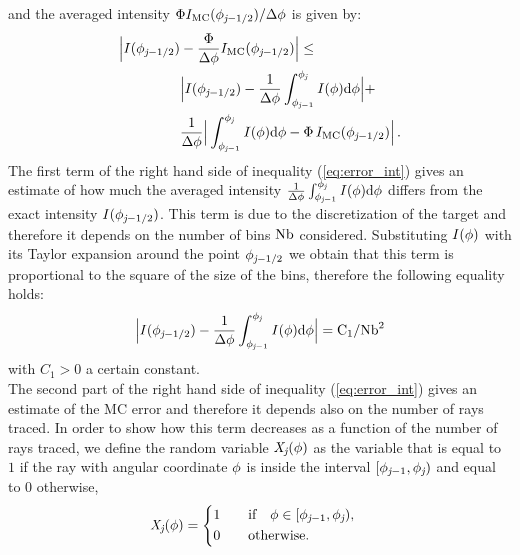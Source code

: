  and the averaged  intensity $\Phi I_{\textrm{MC}}(\phi_{\textit{j}-1/2})/\Delta\phi$ is given by:
\begin{equation}\label{eq:error_int}
\begin{aligned}
\Big|I(\phi_{\textit{j}-1/2})&-\frac{\Phi}
{\Delta\phi}I_{\textrm{MC}}(\phi_{\textit{j}-1/2})\Big| \leq\\
 &\Big|I(\phi_{\textit{j}-1/2})-\frac{1}{\Delta \phi}\int_{\phi_{\textit{j}-1}}^{\phi_{\textit{j}}} I(\phi)\textrm{d}\phi\Big|+\\
&\frac{1}{\Delta \phi}\Big|\int_{\phi_{\textit{j}-1}}^{\phi_{\textit{j}}} I(\phi)\textrm{d}\phi-
\Phi\, I_{\textrm{MC}}(\phi_{\textit{j}-1/2})\Big| \,.
\end{aligned}
\end{equation}
\indent The first term of the right hand side of inequality (\ref{eq:error_int}) gives an estimate of how much the averaged intensity
 $\frac{1}{\Delta \phi}\int_{\phi_{\textit{j}-1}}^{\phi_{\textit{j}}} I(\phi)\textrm{d}\phi$ differs from the exact intensity $I(\phi_{\textit{j}-1/2})$.
This term is due to the discretization of the target and therefore it depends on the number of bins $\textrm{Nb}$ considered.
  Substituting $I(\phi)$ with its Taylor expansion around the point $\phi_{\textit{j}-1/2}$ we obtain that this term is proportional to the square of the size of the bins, therefore the following equality holds:
\begin{equation}\Big|I(\phi_{\textit{j}-1/2})-\frac{1}{\Delta \phi}\int_{\phi_{\textit{j}-1}}^{\phi_{\textit{j}}} I(\phi)\textrm{d}\phi\Big| = \textrm{C}_1/\textrm{Nb}^2\end{equation}
with $C_1>0$ a certain constant. \\
\indent
The second part of the right hand side of inequality (\ref{eq:error_int}) gives an estimate of the MC error and therefore it depends also on the
number of rays traced.
In order to show how this term decreases as a function of the number of rays traced,
we define the random variable $\textit{X}_{\textit{j}}(\phi)$ as the variable that is equal to $1$ if the ray with angular coordinate $\phi$
is inside the interval $[\phi_{\textit{j}-1}, \phi_{\textit{j}})$ and equal to $0$ otherwise,
\begin{equation}
\label{radom_variable}
\textit{X}_{\textit{j}}(\phi) = \begin{cases} \begin{aligned}
1& \qquad \mbox{if} \quad \phi\in [\phi_{\textit{j}-1}, \phi_{\textit{j}}),\\
0 & \qquad \mbox{otherwise}.
\end{aligned}\end{cases}
\end{equation}

